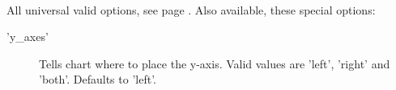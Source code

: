 \Methods
{} \\[\parabstand]
%
\Attributes
All universal valid options, see page \pageref{options}. 
Also available, these special options:
\begin{description}
\item['y\_axes'] Tells chart where to place the y-axis. 
                Valid values are 'left', 'right' and 'both'. Defaults to 'left'.
\end{description}
